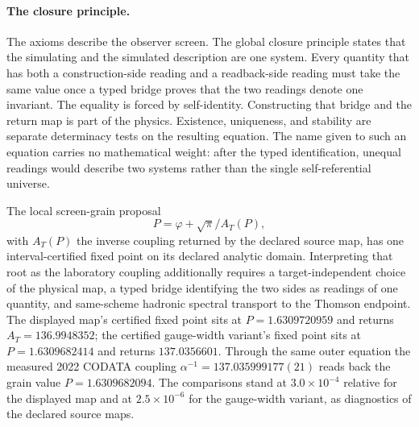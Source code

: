 
\paragraph{The closure principle.}
The axioms describe the observer screen. The global closure principle states
that the simulating and the simulated description are one system. Every quantity that
has both a construction-side reading and a readback-side reading must take
the same value once a typed bridge proves that the two readings denote one
invariant. The equality is forced by self-identity. Constructing that bridge
and the return map is part of the physics. Existence, uniqueness, and
stability are separate determinacy tests on the resulting equation. The name
given to such an equation carries no mathematical weight: after the typed
identification, unequal readings would describe two systems rather than the
single self-referential universe.

The local screen-grain proposal
\[
P=\varphi+\sqrt{\pi}/A_T(P),
\]
with \(A_T(P)\) the inverse coupling returned by the declared source map,
has one interval-certified fixed point on its declared analytic domain.
Interpreting that root as the laboratory coupling additionally requires a
target-independent choice of the physical map, a typed bridge identifying
the two sides as readings of one quantity, and same-scheme hadronic spectral
transport to the Thomson endpoint.
The displayed map's certified fixed point sits at $P=1.6309720959$ and
returns $A_T=136.9948352$; the certified gauge-width variant's fixed
point sits at $P=1.6309682414$ and returns $137.0356601$. Through the
same outer equation the measured 2022 CODATA coupling
$\alpha^{-1}=137.035999177(21)$ reads back the grain value
$P=1.6309682094$. The comparisons stand at $3.0\times10^{-4}$ relative
for the displayed map and at $2.5\times10^{-6}$ for the gauge-width
variant, as diagnostics of the declared source maps.

